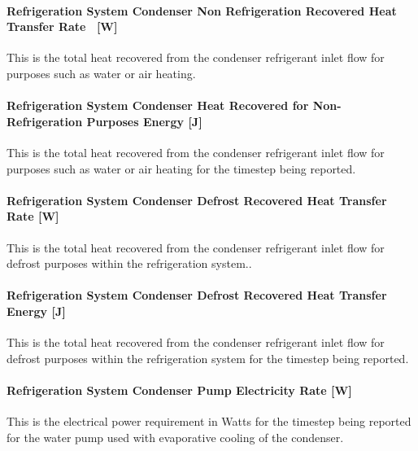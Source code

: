 \paragraph{Refrigeration System Condenser Non Refrigeration Recovered Heat Transfer Rate~ {[}W{]}}\label{refrigeration-system-condenser-non-refrigeration-recovered-heat-transfer-rate-w-1}

This is the total heat recovered from the condenser refrigerant inlet flow for purposes such as water or air heating.

\paragraph{Refrigeration System Condenser Heat Recovered for Non-Refrigeration Purposes Energy {[}J{]}}\label{refrigeration-system-condenser-heat-recovered-for-non-refrigeration-purposes-energy-j}

This is the total heat recovered from the condenser refrigerant inlet flow for purposes such as water or air heating for the timestep being reported.

\paragraph{Refrigeration System Condenser Defrost Recovered Heat Transfer Rate {[}W{]}}\label{refrigeration-system-condenser-defrost-recovered-heat-transfer-rate-w-1}

This is the total heat recovered from the condenser refrigerant inlet flow for defrost purposes within the refrigeration system..

\paragraph{Refrigeration System Condenser Defrost Recovered Heat Transfer Energy {[}J{]}}\label{refrigeration-system-condenser-defrost-recovered-heat-transfer-energy-j-1}

This is the total heat recovered from the condenser refrigerant inlet flow for defrost purposes within the refrigeration system for the timestep being reported.

\paragraph{Refrigeration System Condenser Pump Electricity Rate {[}W{]}}\label{refrigeration-system-condenser-pump-electric-power-w}

This is the electrical power requirement in Watts for the timestep being reported for the water pump used with evaporative cooling of the condenser.

